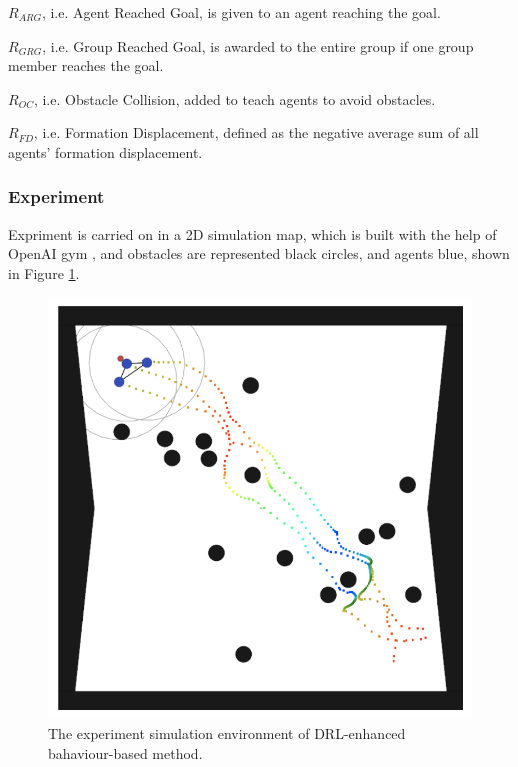 \begin{compactenum}
	\item $R_{ARG}$, i.e. Agent Reached Goal, is given to an agent reaching the goal.
	\item $R_{GRG}$, i.e. Group Reached Goal, is awarded to the entire group if one group member reaches the goal.
	\item $R_{OC}$, i.e. Obstacle Collision, added to teach agents to avoid obstacles.
	\item $R_{FD}$, i.e. Formation Displacement, defined as the negative average sum of all agents' formation displacement.
\end{compactenum}

\subsubsection{Experiment}

Expriment is carried on in a 2D simulation map, which is built with the help of OpenAI gym \cite{brockman2016openai}, and obstacles are represented black circles, and agents blue, shown in Figure \ref{fig:drlbbexperiment}.

\begin{figure}
	\centering
	\includegraphics[width=5in]{drlbbexperiment.png}
	\caption{The experiment simulation environment of DRL-enhanced bahaviour-based method.}
	\label{fig:drlbbexperiment} 
\end{figure}

